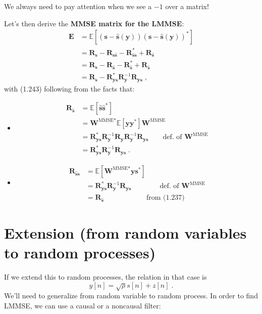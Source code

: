 \documentclass[a4paper, 12pt]{book}
\begin{document}
We always need to pay attention when we see a $-1$ over a matrix!

Let's then derive the \textbf{MMSE matrix for the LMMSE}:
\begin{align}
\bm{E} &= \mathbb{E}[(\bm{s} - \hat{\bm{s}}(\bm{y}))(\bm{s} - \hat{\bm{s}}(\bm{y}))^*] \tag{1.241} \\
&= \bm{R}_{\bm{s}} - \bm{R}_{\bm{s}\hat{\bm{s}}} - \bm{R}_{\hat{\bm{s}}\bm{s}}^* + \bm{R}_{\hat{\bm{s}}} \tag{1.242} \\
&= \bm{R}_{\bm{s}} - \bm{R}_{\hat{\bm{s}}} - \bm{R}_{\hat{\bm{s}}}^* + \bm{R}_{\hat{\bm{s}}} \nonumber \\
&= \bm{R}_{\bm{s}} - \bm{R}_{\bm{ys}}^*\bm{R}_{\bm{y}}^{-1}\bm{R}_{\bm{ys}} \;, \tag{1.243}
\end{align}
with (1.243) following from the facts that:
\begin{itemize}[label=\textcolor{gray}{\textbullet}]
    \item
    \begin{align}
    \bm{R}_{\hat{\bm{s}}} &= \mathbb{E}[\hat{\bm{s}}\hat{\bm{s}}^*] \tag{1.234} \\
    &= \bm{W}^{\text{MMSE}*} \mathbb{E}[\bm{y}\bm{y}^*] \bm{W}^{\text{MMSE}} \tag{1.235} \\
    &= \bm{R}_{\bm{ys}}^*\bm{R}_{\bm{y}}^{-1} \bm{R}_{\bm{y}} \bm{R}_{\bm{y}}^{-1}\bm{R}_{\bm{ys}} \qquad \text{def. of } \bm{W}^{\text{MMSE}} \tag{1.236} \\
    &= \bm{R}_{\bm{ys}}^*\bm{R}_{\bm{y}}^{-1}\bm{R}_{\bm{ys}} \;. \tag{1.237}
    \end{align}
    \item
    \begin{align}
    \bm{R}_{\hat{\bm{s}}\bm{s}} &= \mathbb{E}[\bm{W}^{\text{MMSE}*}\bm{y}\bm{s}^*] \tag{1.238} \\
    &= \bm{R}_{\bm{ys}}^*\bm{R}_{\bm{y}}^{-1}\bm{R}_{\bm{ys}} \qquad \qquad \text{def. of } \bm{W}^{\text{MMSE}} \tag{1.239} \\
    &= \bm{R}_{\hat{\bm{s}}} \qquad \qquad \qquad \text{from (1.237)} \tag{1.240}
    \end{align}
\end{itemize}

\section{Extension (from random variables to random processes)}

If we extend this to random processes, the relation in that case is
$$
y[n] = \sqrt{\rho}s[n] + z[n] \;.
$$
We'll need to generalize from random variable to random process.
In order to find LMMSE, we can use a causal or a noncausal filter:
\end{document}
